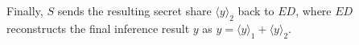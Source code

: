\documentclass[conference]{IEEEtran}
\newcommand{\DEnc}{\texttt{DEnc}}
\newcommand{\PEnc}{\texttt{PEnc}}
\begin{document}
Finally, $S$ sends the resulting secret share $\langle y \rangle_2$ back to $ED$, where $ED$ reconstructs the final inference result $y$ as $y=\langle y \rangle_1 + \langle y \rangle_2$.





\end{document}
